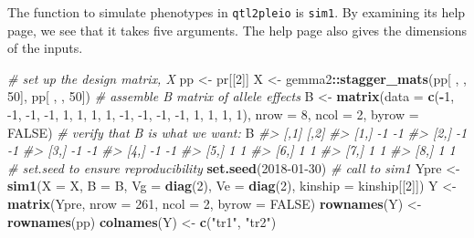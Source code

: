 \documentclass[oneside]{book}
\newenvironment{Shaded}{\begin{snugshade}}{\end{snugshade}}
\newcommand{\CommentTok}[1]{\textcolor[rgb]{0.56,0.35,0.01}{\textit{#1}}}
\newcommand{\DataTypeTok}[1]{\textcolor[rgb]{0.13,0.29,0.53}{#1}}
\newcommand{\DecValTok}[1]{\textcolor[rgb]{0.00,0.00,0.81}{#1}}
\newcommand{\KeywordTok}[1]{\textcolor[rgb]{0.13,0.29,0.53}{\textbf{#1}}}
\newcommand{\NormalTok}[1]{#1}
\newcommand{\OperatorTok}[1]{\textcolor[rgb]{0.81,0.36,0.00}{\textbf{#1}}}
\newcommand{\OtherTok}[1]{\textcolor[rgb]{0.56,0.35,0.01}{#1}}
\newcommand{\StringTok}[1]{\textcolor[rgb]{0.31,0.60,0.02}{#1}}
\begin{document}
The function to simulate phenotypes in \texttt{qtl2pleio} is
\texttt{sim1}. By examining its help page, we see that it takes five
arguments. The help page also gives the dimensions of the inputs.

\begin{Shaded}
\begin{Highlighting}[]
\CommentTok{# set up the design matrix, X}
\NormalTok{pp <-}\StringTok{ }\NormalTok{pr[[}\DecValTok{2}\NormalTok{]]}
\NormalTok{X <-}\StringTok{ }\NormalTok{gemma2}\OperatorTok{::}\KeywordTok{stagger_mats}\NormalTok{(pp[ , , }\DecValTok{50}\NormalTok{], pp[ , , }\DecValTok{50}\NormalTok{])}
\CommentTok{# assemble B matrix of allele effects}
\NormalTok{B <-}\StringTok{ }\KeywordTok{matrix}\NormalTok{(}\DataTypeTok{data =} \KeywordTok{c}\NormalTok{(}\OperatorTok{-}\DecValTok{1}\NormalTok{, }\DecValTok{-1}\NormalTok{, }\DecValTok{-1}\NormalTok{, }\DecValTok{-1}\NormalTok{, }\DecValTok{1}\NormalTok{, }\DecValTok{1}\NormalTok{, }\DecValTok{1}\NormalTok{, }\DecValTok{1}\NormalTok{, }\DecValTok{-1}\NormalTok{, }\DecValTok{-1}\NormalTok{, }\DecValTok{-1}\NormalTok{, }\DecValTok{-1}\NormalTok{, }\DecValTok{1}\NormalTok{, }\DecValTok{1}\NormalTok{, }\DecValTok{1}\NormalTok{, }\DecValTok{1}\NormalTok{), }\DataTypeTok{nrow =} \DecValTok{8}\NormalTok{, }\DataTypeTok{ncol =} \DecValTok{2}\NormalTok{, }\DataTypeTok{byrow =} \OtherTok{FALSE}\NormalTok{)}
\CommentTok{# verify that B is what we want:}
\NormalTok{B}
\CommentTok{#>      [,1] [,2]}
\CommentTok{#> [1,]   -1   -1}
\CommentTok{#> [2,]   -1   -1}
\CommentTok{#> [3,]   -1   -1}
\CommentTok{#> [4,]   -1   -1}
\CommentTok{#> [5,]    1    1}
\CommentTok{#> [6,]    1    1}
\CommentTok{#> [7,]    1    1}
\CommentTok{#> [8,]    1    1}
\CommentTok{# set.seed to ensure reproducibility}
\KeywordTok{set.seed}\NormalTok{(}\DecValTok{2018-01-30}\NormalTok{)}
\CommentTok{# call to sim1}
\NormalTok{Ypre <-}\StringTok{ }\KeywordTok{sim1}\NormalTok{(}\DataTypeTok{X =}\NormalTok{ X, }\DataTypeTok{B =}\NormalTok{ B, }\DataTypeTok{Vg =} \KeywordTok{diag}\NormalTok{(}\DecValTok{2}\NormalTok{), }\DataTypeTok{Ve =} \KeywordTok{diag}\NormalTok{(}\DecValTok{2}\NormalTok{), }\DataTypeTok{kinship =}\NormalTok{ kinship[[}\DecValTok{2}\NormalTok{]])}
\NormalTok{Y <-}\StringTok{ }\KeywordTok{matrix}\NormalTok{(Ypre, }\DataTypeTok{nrow =} \DecValTok{261}\NormalTok{, }\DataTypeTok{ncol =} \DecValTok{2}\NormalTok{, }\DataTypeTok{byrow =} \OtherTok{FALSE}\NormalTok{)}
\KeywordTok{rownames}\NormalTok{(Y) <-}\StringTok{ }\KeywordTok{rownames}\NormalTok{(pp)}
\KeywordTok{colnames}\NormalTok{(Y) <-}\StringTok{ }\KeywordTok{c}\NormalTok{(}\StringTok{"tr1"}\NormalTok{, }\StringTok{"tr2"}\NormalTok{)}
\end{Highlighting}
\end{Shaded}
\end{document}

